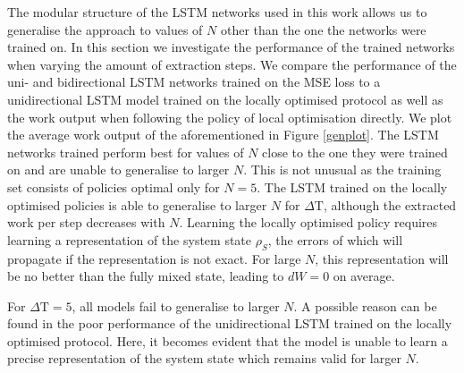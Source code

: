 The modular structure of the LSTM networks used in this work allows us to generalise the approach to values of $N$ other than the one the networks were trained on.
In this section we investigate the performance of the trained networks when varying the amount of extraction steps.
We compare the performance of the uni- and bidirectional LSTM networks trained on the MSE loss to a unidirectional LSTM model trained on the locally optimised protocol as well as the work output when following the policy of local optimisation directly.
We plot the average work output of the aforementioned in Figure \ref{genplot}.
The LSTM networks trained perform best for values of $N$ close to the one they were trained on and are unable to generalise to larger $N$.
This is not unusual as the training set consists of policies optimal only for $N=5$.
The LSTM trained on the locally optimised policies is able to generalise to larger $N$ for $\Delta \mathrm{T}$, although the extracted work per step decreases with $N$.
Learning the locally optimised policy requires learning a representation of the system state $\rho_S$, the errors of which will propagate if the representation is not exact.
For large $N$, this representation will be no better than the fully mixed state, leading to $dW = 0$ on average.

For $\Delta \mathrm{T} = 5$, all models fail to generalise to larger $N$.
A possible reason can be found in the poor performance of the unidirectional LSTM trained on the locally optimised protocol.
Here, it becomes evident that the model is unable to learn a precise representation of the system state which remains valid for larger $N$.


